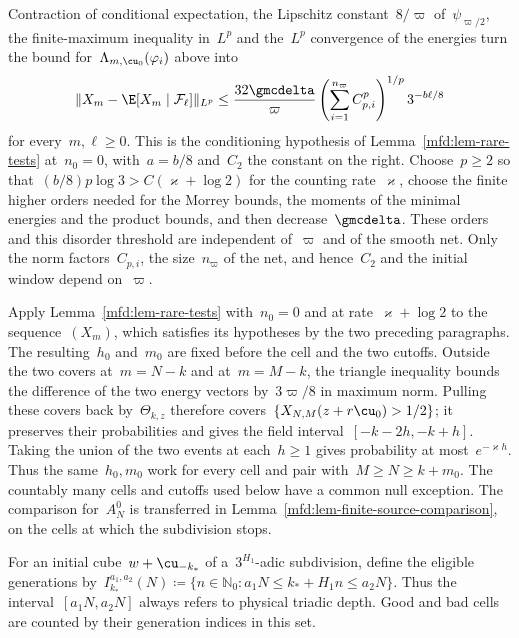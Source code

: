 \documentclass[11pt]{amsart}
\begin{document}
Contraction of conditional expectation, the Lipschitz constant~$8/\varpi$ of~$\psi_{\varpi/2}$, the finite-maximum inequality in~$L^p$ and the~$L^p$ convergence of the energies turn the bound for~$\Lambda_{m,\cu_0}(\varphi_i)$ above into
\begin{equation*}
	\|X_m-\E[X_m\mid\mathcal F_\ell]\|_{L^p}
	\leq \frac{32\gmcdelta}{\varpi}
	\left(\sum_{i=1}^{n_\varpi} C_{p,i}^p\right)^{1/p}3^{-b\ell/8}
\end{equation*}
for every~$m,\ell\geq0$. This is the conditioning hypothesis of Lemma~\ref{mfd:lem-rare-tests} at~$n_0=0$, with~$a=b/8$ and~$C_2$ the constant on the right. Choose~$p\geq2$ so that~$(b/8)p\log3>C(\varkappa+\log2)$ for the counting rate~$\varkappa$, choose the finite higher orders needed for the Morrey bounds, the moments of the minimal energies and the product bounds, and then decrease~$\gmcdelta$. These orders and this disorder threshold are independent of~$\varpi$ and of the smooth net. Only the norm factors~$C_{p,i}$, the size~$n_\varpi$ of the net, and hence~$C_2$ and the initial window depend on~$\varpi$.

\smallskip

Apply Lemma~\ref{mfd:lem-rare-tests} with~$n_0=0$ and at rate~$\varkappa+\log2$ to the sequence~$(X_m)$, which satisfies its hypotheses by the two preceding paragraphs. The resulting~$h_0$ and~$m_0$ are fixed before the cell and the two cutoffs. Outside the two covers at~$m=N-k$ and at~$m=M-k$, the triangle inequality bounds the difference of the two energy vectors by~$3\varpi/8$ in maximum norm. Pulling these covers back by~$\Theta_{k,z}$ therefore covers~$\{X_{N,M}(z+r\cu_0)>1/2\}$; it preserves their probabilities and gives the field interval~$[-k-2h,-k+h]$. Taking the union of the two events at each~$h\geq1$ gives probability at most~$e^{-\varkappa h}$. Thus the same~$h_0,m_0$ work for every cell and pair with~$M\geq N\geq k+m_0$. The countably many cells and cutoffs used below have a common null exception. The comparison for~$A_N^0$ is transferred in Lemma~\ref{mfd:lem-finite-source-comparison}, on the cells at which the subdivision stops.

\smallskip

For an initial cube~$w+\cu_{-k_*}$ of a~$3^{H_1}$-adic subdivision, define the eligible generations by~$I_{k_*}^{a_1,a_2}(N)\coloneqq\{n\in\mathbb N_0:a_1N\leq k_*+H_1n\leq a_2N\}$. Thus the interval~$[a_1N,a_2N]$ always refers to physical triadic depth. Good and bad cells are counted by their generation indices in this set.
\end{document}
